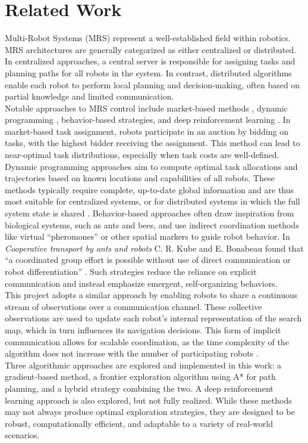 \section{Related Work}
Multi-Robot Systems (MRS) represent a well-established field within robotics. MRS architectures are generally categorized as either centralized or distributed. In centralized approaches, a central server is responsible for assigning tasks and planning paths for all robots in the system. 
In contrast, distributed algorithms enable each robot to perform local planning and decision-making, often based on partial knowledge and limited communication. \\

Notable approaches to MRS control include market-based methods \cite{trigui2014market}, dynamic programming \cite{kato2011dp}, behavior-based strategies, and deep reinforcement learning \cite{huttenrauch2019deep-swarm}. In market-based task assignment, robots participate in an auction by bidding on tasks, with the highest bidder receiving the assignment. This method can lead to near-optimal task distributions, especially when task costs are well-defined. Dynamic programming approaches aim to compute optimal task allocations and trajectories based on known locations and capabilities of all robots. These methods typically require complete, up-to-date global information and are thus most suitable for centralized systems, or for distributed systems in which the full system state is shared \cite{multi-robot-search-moving-target}. Behavior-based approaches often draw inspiration from biological systems, such as ants and bees, and use indirect coordination methods like virtual “pheromones” or other spatial markers to guide robot behavior. In \textit{Cooperative transport by ants and robots} C. R. Kube and E. Bonabeau found that “a coordinated group effort is possible without use of direct communication or robot differentiation” \cite{kube2000cooperative-ants}. Such strategies reduce the reliance on explicit communication and instead emphasize emergent, self-organizing behaviors. \\

This project adopts a similar approach by enabling robots to share a continuous stream of observations over a communication channel. These collective observations are used to update each robot’s internal representation of the search map, which in turn influences its navigation decisions. This form of implicit communication allows for scalable coordination, as the time complexity of the algorithm does not increase with the number of participating robots \cite{multi-robot-search-moving-target}. \\

Three algorithmic approaches are explored and implemented in this work: a gradient-based method, a frontier exploration algorithm using A* for path planning, and a hybrid strategy combining the two. A deep reinforcement learning approach is also explored, but not fully realized. While these methods may not always produce optimal exploration strategies, they are designed to be robust, computationally efficient, and adaptable to a variety of real-world scenarios.

